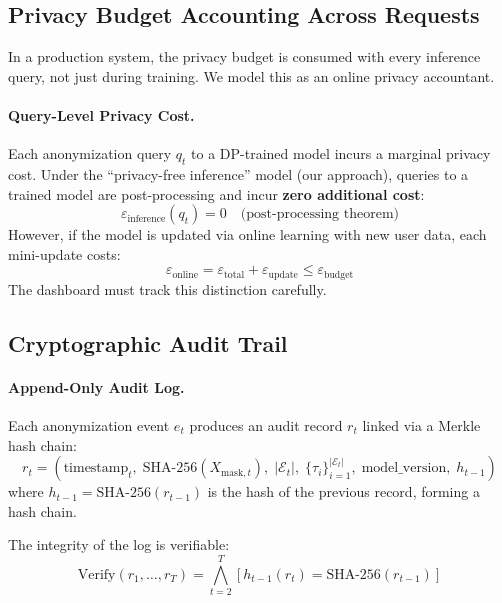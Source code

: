 \documentclass[11pt, a4paper]{article}
\newcommand{\eps}{\varepsilon}
\begin{document}
\subsection{Privacy Budget Accounting Across Requests}

In a production system, the privacy budget is consumed with every inference query, not just during training. We model this as an online privacy accountant.

\paragraph{Query-Level Privacy Cost.}
Each anonymization query $q_t$ to a DP-trained model incurs a marginal privacy cost. Under the ``privacy-free inference'' model (our approach), queries to a trained model are post-processing and incur \textbf{zero additional cost}:
\begin{equation}
\eps_{\text{inference}}(q_t) = 0 \quad \text{(post-processing theorem)}
\end{equation}
However, if the model is updated via online learning with new user data, each mini-update costs:
\begin{equation}
\eps_{\text{online}} = \eps_{\text{total}} + \eps_{\text{update}} \leq \eps_{\text{budget}}
\end{equation}
The dashboard must track this distinction carefully.

\subsection{Cryptographic Audit Trail}

\paragraph{Append-Only Audit Log.}
Each anonymization event $e_t$ produces an audit record $r_t$ linked via a Merkle hash chain:
\begin{equation}
r_t = \left(\text{timestamp}_t, \; \text{SHA-256}(X_{\text{mask},t}), \; |\mathcal{E}_t|, \; \{\tau_i\}_{i=1}^{|\mathcal{E}_t|}, \; \text{model\_version}, \; h_{t-1}\right)
\end{equation}
where $h_{t-1} = \text{SHA-256}(r_{t-1})$ is the hash of the previous record, forming a hash chain.

The integrity of the log is verifiable:
\begin{equation}
\text{Verify}(r_1, \ldots, r_T) = \bigwedge_{t=2}^{T} \left[h_{t-1}(r_t) = \text{SHA-256}(r_{t-1})\right]
\end{equation}
\end{document}
